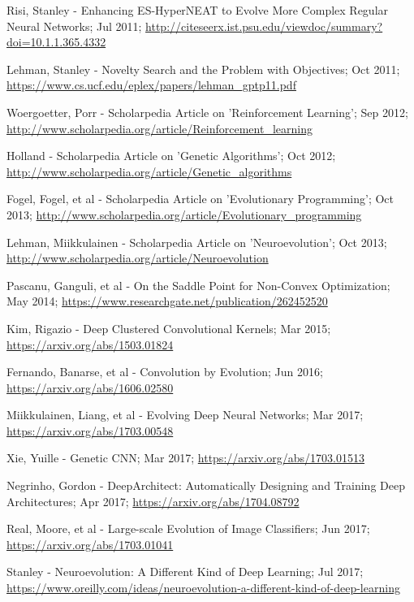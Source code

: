 \documentclass[journal, a4paper]{IEEEtran}
\begin{document}
\begin{thebibliography}{5}
    Risi, Stanley - Enhancing ES-HyperNEAT to Evolve More Complex Regular Neural Networks; Jul 2011;
    \url{http://citeseerx.ist.psu.edu/viewdoc/summary?doi=10.1.1.365.4332}

    Lehman, Stanley - Novelty Search and the Problem with Objectives; Oct 2011;
    \url{https://www.cs.ucf.edu/eplex/papers/lehman_gptp11.pdf}

    Woergoetter, Porr - Scholarpedia Article on 'Reinforcement Learning'; Sep 2012;
    \url{http://www.scholarpedia.org/article/Reinforcement_learning}

    Holland - Scholarpedia Article on 'Genetic Algorithms'; Oct 2012;
    \url{http://www.scholarpedia.org/article/Genetic_algorithms}

    Fogel, Fogel, et al - Scholarpedia Article on 'Evolutionary Programming'; Oct 2013;
    \url{http://www.scholarpedia.org/article/Evolutionary_programming}

    Lehman, Miikkulainen - Scholarpedia Article on 'Neuroevolution'; Oct 2013;
    \url{http://www.scholarpedia.org/article/Neuroevolution}

    Pascanu, Ganguli, et al - On the Saddle Point for Non-Convex Optimization; May 2014;
    \url{https://www.researchgate.net/publication/262452520}

    Kim, Rigazio - Deep Clustered Convolutional Kernels; Mar 2015;
    \url{https://arxiv.org/abs/1503.01824}

    Fernando, Banarse, et al - Convolution by Evolution; Jun 2016;
    \url{https://arxiv.org/abs/1606.02580}

    Miikkulainen, Liang, et al - Evolving Deep Neural Networks; Mar 2017;
    \url{https://arxiv.org/abs/1703.00548}

    Xie, Yuille - Genetic CNN; Mar 2017;
    \url{https://arxiv.org/abs/1703.01513}

    Negrinho, Gordon - DeepArchitect: Automatically Designing and Training Deep Architectures; Apr 2017;
    \url{https://arxiv.org/abs/1704.08792}

    Real, Moore, et al - Large-scale Evolution of Image Classifiers; Jun 2017;
    \url{https://arxiv.org/abs/1703.01041}

    Stanley - Neuroevolution: A Different Kind of Deep Learning; Jul 2017;
    \url{https://www.oreilly.com/ideas/neuroevolution-a-different-kind-of-deep-learning}


\end{thebibliography}
\end{document}
